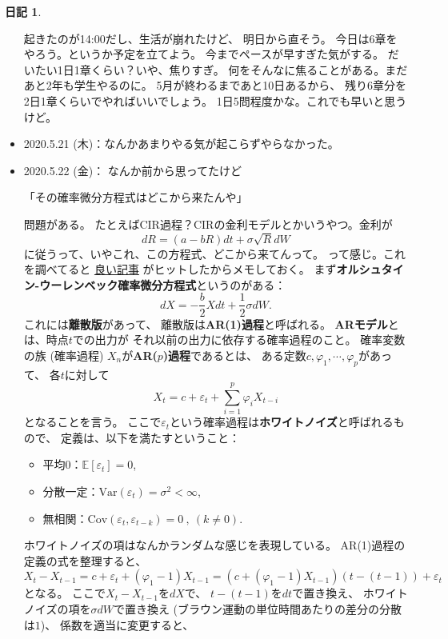 \documentclass[uplatex]{jsarticle}
\theoremstyle{definition}
\newtheorem*{nikki*}{日記}
\def\ep{\varepsilon}
\def\E{\mathbb{E}}
\newcommand{\Var}{\mathrm{Var}}
\newcommand{\Cov}{\mathrm{Cov}}
\begin{document}
\begin{nikki*}
\begin{itemize}
    起きたのが14:00だし、生活が崩れたけど、
    明日から直そう。
    今日は6章をやろう。というか予定を立てよう。
    今までペースが早すぎた気がする。
    だいたい1日1章くらい？いや、焦りすぎ。
    何をそんなに焦ることがある。まだあと2年も学生やるのに。
    5月が終わるまであと10日あるから、
    残り6章分を2日1章くらいでやればいいでしょう。
    1日5問程度かな。これでも早いと思うけど。
    \item
    2020.5.21 (木)：なんかあまりやる気が起こらずやらなかった。
    \item
    2020.5.22 (金)：
    なんか前から思ってたけど
    \begin{center}
      「その確率微分方程式はどこから来たんや」
    \end{center}
    問題がある。
    たとえばCIR過程？CIRの金利モデルとかいうやつ。金利が
    \[
    dR = (a-bR)dt + \sigma \sqrt{R}dW
    \]
    に従うって、いやこれ、この方程式、どこから来てんって。
    って感じ。これを調べてると
    \href{http://mathfin.web.fc2.com/deriv2/imi_deriv224.html}{良い記事}
    がヒットしたからメモしておく。
    まず\textbf{オルシュタイン-ウーレンベック確率微分方程式}というのがある：
    \[
    dX = -\frac{b}{2}Xdt + \frac{1}{2}\sigma dW.
    \]
    これには\textbf{離散版}があって、
    離散版は\textbf{AR(1)過程}と呼ばれる。
    \textbf{ARモデル}とは、時点\(t\)での出力が
    それ以前の出力に依存する確率過程のこと。
    確率変数の族 (確率過程)
    \(X_n\)が\textbf{AR(\(p\))過程}であるとは、
    ある定数\(c, \varphi_1,\cdots ,\varphi_p\)があって、
    各\(t\)に対して
    \[
    X_t = c + \ep_t + \sum_{i=1}^p \varphi_iX_{t-i}
    \]
    となることを言う。
    ここで\(\ep_t\)という確率過程は\textbf{ホワイトノイズ}と呼ばれるもので、
    定義は、以下を満たすということ：
    \begin{itemize}
      \item  平均\(0\)：\(\E[\ep_t] = 0\),
      \item  分散一定：\(\Var(\ep_t) = \sigma^2 < \infty\),
      \item  無相関：\(\Cov(\ep_t,\ep_{t-k}) = 0 \ , \ (k\neq 0)\).
    \end{itemize}
    ホワイトノイズの項はなんかランダムな感じを表現している。
    AR(1)過程の定義の式を整理すると、
    \[
    X_t-X_{t-1} = c + \ep_t + (\varphi_1 - 1)X_{t-1}
    = (c+(\varphi_1-1)X_{t-1})(t-(t-1)) + \ep_t
    \]
    となる。
    ここで\(X_t-X_{t-1}\)を\(dX\)で、
    \(t-(t-1)\)を\(dt\)で置き換え、
    ホワイトノイズの項を\(\sigma dW\)で置き換え
    (ブラウン運動の単位時間あたりの差分の分散は\(1\))、
    係数を適当に変更すると、
    \[
\]
\end{itemize}
\end{nikki*}
\end{document}
